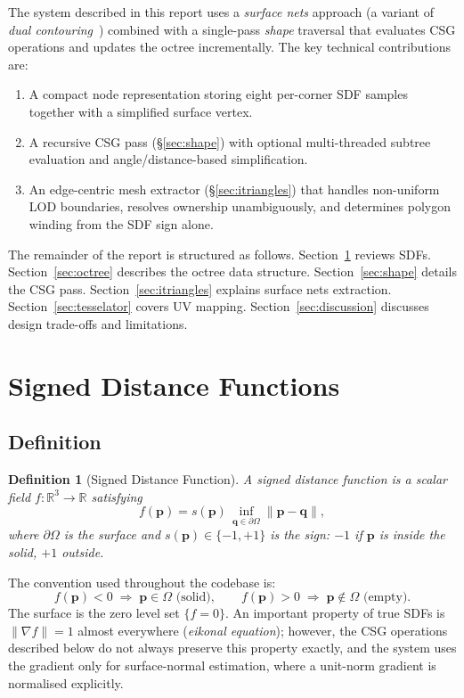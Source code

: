 \documentclass[10pt,a4paper]{article}
\newtheorem{definition}{Definition}
\begin{document}
The system described in this report uses a \emph{surface nets} approach
(a variant of \emph{dual contouring}~\cite{ju02}) combined with a
single-pass \emph{shape} traversal that evaluates CSG operations and
updates the octree incrementally.  The key technical contributions are:
\begin{enumerate}
  \item A compact node representation storing eight per-corner SDF samples
    together with a simplified surface vertex.
  \item A recursive CSG pass (\S\ref{sec:shape}) with optional
    multi-threaded subtree evaluation and angle/distance-based
    simplification.
  \item An edge-centric mesh extractor (\S\ref{sec:itriangles}) that
    handles non-uniform LOD boundaries, resolves ownership unambiguously,
    and determines polygon winding from the SDF sign alone.
\end{enumerate}

\bigskip\noindent
The remainder of the report is structured as follows.
Section~\ref{sec:sdf} reviews SDFs.
Section~\ref{sec:octree} describes the octree data structure.
Section~\ref{sec:shape} details the CSG pass.
Section~\ref{sec:itriangles} explains surface nets extraction.
Section~\ref{sec:tesselator} covers UV mapping.
Section~\ref{sec:discussion} discusses design trade-offs and limitations.

\section{Signed Distance Functions}
\label{sec:sdf}

\subsection{Definition}

\begin{definition}[Signed Distance Function]
A \emph{signed distance function} is a scalar field
$f:\mathbb{R}^3\to\mathbb{R}$ satisfying
\[
  f(\mathbf{p}) = s(\mathbf{p})\,\inf_{\mathbf{q}\in\partial\Omega}
    \|\mathbf{p}-\mathbf{q}\|,
\]
where $\partial\Omega$ is the surface and $s(\mathbf{p})\in\{-1,+1\}$
is the sign: $-1$ if $\mathbf{p}$ is inside the solid, $+1$ outside.
\end{definition}

\noindent The convention used throughout the codebase is:
\[
  f(\mathbf{p}) < 0 \;\Longrightarrow\; \mathbf{p}\in\Omega\text{ (solid)},
  \qquad
  f(\mathbf{p}) > 0 \;\Longrightarrow\; \mathbf{p}\notin\Omega\text{ (empty)}.
\]
The surface is the zero level set $\{f=0\}$.  An important property of
true SDFs is $\|\nabla f\| = 1$ almost everywhere
(\emph{eikonal equation}); however, the CSG operations described below
do not always preserve this property exactly, and the system uses the
gradient only for surface-normal estimation, where a unit-norm gradient
is normalised explicitly.
\end{document}

